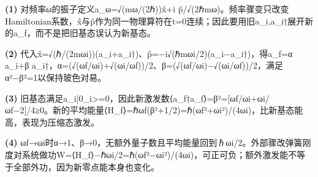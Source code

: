 \par\noindent\textbf{(1)} 对频率ω的振子定义a\_ω=√(mω/(2ℏ))x̂+i p̂/√(2ℏmω)。频率骤变只改变Hamiltonian系数，x̂与p̂作为同一物理算符在t=0连续；因此要用旧a\_i,a\_i†展开新的a\_f，而不是把旧基态误认为新基态。
\par\noindent\textbf{(2)} 代入x̂=√(ℏ/(2mωi))(a\_i+a\_i†)、p̂=−i√(ℏmωi/2)(a\_i−a\_i†)，得a\_f=α a\_i+β a\_i†，α=(√(ωf/ωi)+√(ωi/ωf))/2、β=(√(ωf/ωi)−√(ωi/ωf))/2，满足α²−β²=1以保持玻色对易。
\par\noindent\textbf{(3)} 旧基态满足a\_i|0\_i>=0，因此新激发数⟨a\_f†a\_f⟩=β²=[ωf/ωi+ωi/ωf−2]/4≥0。新的平均能量⟨H\_f⟩=ℏωf(β²+1/2)=ℏ(ωf²+ωi²)/(4ωi)，比新基态能高，表现为压缩态激发。
\par\noindent\textbf{(4)} ωf→ωi时α→1、β→0，无额外量子数且平均能量回到ℏωi/2。外部骤改弹簧刚度对系统做功W=⟨H\_f⟩−ℏωi/2=ℏ(ωf²−ωi²)/(4ωi)，可正可负；额外激发能不等于全部外功，因为新零点能本身也变化。
